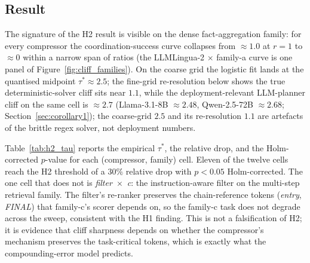\subsection{Result}

The signature of the H2 result is visible on the dense
fact-aggregation family: for every compressor the
coordination-success curve collapses from $\approx1.0$ at $r=1$ to
$\approx0$ within a narrow span of ratios (the LLMLingua-2 $\times$
family-a curve is one panel of Figure~\ref{fig:cliff_families}). On
the coarse grid the logistic fit lands at the quantised midpoint
$\tau^{*}\approx2.5$; the fine-grid re-resolution below shows the
true deterministic-solver cliff sits near $1.1$, while the
deployment-relevant LLM-planner cliff on the same cell is
$\approx2.7$ (Llama-3.1-8B $\approx2.48$, Qwen-2.5-72B $\approx2.68$;
Section~\ref{sec:corollary1}); the coarse-grid $2.5$ and its
re-resolution $1.1$ are artefacts of the brittle regex solver, not
deployment numbers.

Table~\ref{tab:h2_tau} reports the empirical $\tau^{*}$, the
relative drop, and the Holm-corrected $p$-value for each
(compressor, family) cell. Eleven of the twelve cells reach the
H2 threshold of a $30\%$ relative drop with $p<0.05$ Holm-corrected.
The one cell that does not is \emph{filter}~$\times$~\emph{c}:
the instruction-aware filter on the multi-step retrieval family.
The filter's re-ranker preserves the chain-reference tokens
(\emph{entry}, \emph{FINAL}) that family-c's scorer depends on, so
the family-c task does not degrade across the sweep, consistent with
the H1 finding. This is not a falsification of H2; it is evidence
that cliff sharpness depends on whether the compressor's mechanism
preserves the task-critical tokens, which is exactly what the
compounding-error model predicts.

